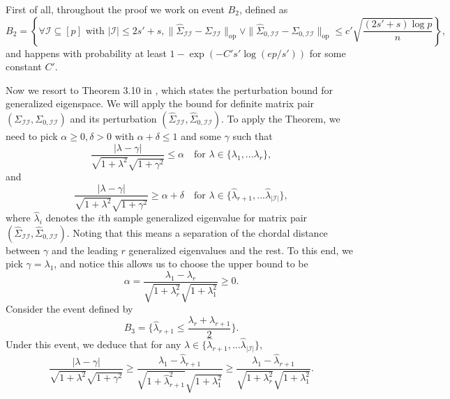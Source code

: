 \documentclass[11pt]{article}
\newcommand{\cI}{{\mathcal{I}}}
\newcommand{\0}{{\mathbf{0}}}
\begin{document}
\iffalse
First of all, throughout the proof we work on event $B_2$, defined as \begin{equation*}
B_2 = 
\left\{ \forall\text{$\cI\subseteq [p]$ with $|\cI|\leq 2s'+s,
\|\widehat{\Sigma}_{\cI\cI}-\Sigma_{\cI\cI}\|_{\mathrm{op}}\vee
\|\widehat{\Sigma}_{0,\cI\cI}-\Sigma_{0,\cI\cI}\|_{\mathrm{op}}
\leq c'\sqrt{\frac{(2s'+s)\log p}{n}}$}
\right \},
\end{equation*}
and happens with probability at least $1-\exp(-C's'\log(ep/s'))$ for some constant $C'$. 
\par Now we resort to Theorem 3.10 in \cite{stsu90}, which states the perturbation bound for generalized eigenspace. 
We will apply the bound for definite matrix pair $(\Sigma_{\cI\cI},\Sigma_{0,\cI\cI})$ and its perturbation $(\widehat{\Sigma}_{\cI\cI},\widehat{\Sigma}_{0,\cI\cI})$. To apply the Theorem, we need to pick $\alpha\geq 0, \delta>0$ with $\alpha+\delta\leq 1$ and some $\gamma$ such that \begin{equation*}
\frac{|\lambda-\gamma|}{\sqrt{1+\lambda^2}\sqrt{1+\gamma^2}}\leq \alpha\quad \text{for $\lambda\in\{\lambda_1,...\lambda_r\}$},
\end{equation*}
and \begin{equation*}
\frac{|\lambda-\gamma|}{\sqrt{1+\lambda^2}\sqrt{1+\gamma^2}}\geq \alpha+\delta\quad \text{for $\lambda\in\{\widehat{\lambda}_{r+1},...\widehat{\lambda}_{|\cI|}\}$},
\end{equation*}
where $\widehat{\lambda}_i$ denotes the $i$th sample generalized eigenvalue for matrix pair $(\widehat{\Sigma}_{\cI\cI},\widehat{\Sigma}_{0,\cI\cI})$. 
Noting that this means a separation of the chordal distance between $\gamma$ and the leading $r$ generalized eigenvalues and the rest. To this end, we pick $\gamma=\lambda_1$, and notice this allows us to choose the upper bound to be \begin{equation*}
\alpha=\frac{\lambda_1-\lambda_r}{\sqrt{1+\lambda_r^2}\sqrt{1+\lambda_1^2}}\geq 0.
\end{equation*}
Consider the event defined by \begin{equation*}
B_3=\{\widehat{\lambda}_{r+1}\leq \frac{\lambda_r+\lambda_{r+1}}{2}\}.
\end{equation*}Under this event, we deduce that for any $\lambda\in\{\widehat{\lambda}_{r+1},...\widehat{\lambda}_{|\cI|}\}$,\begin{equation*}
\frac{|\lambda-\gamma|}{\sqrt{1+\lambda^2}\sqrt{1+\gamma^2}}\ge \frac{\lambda_1-\widehat{\lambda}_{r+1}}{\sqrt{1+\widehat{\lambda}_{r+1}^2}\sqrt{1+\lambda_1^2}}\ge\frac{\lambda_1-\widehat{\lambda}_{r+1}}{\sqrt{1+\lambda_{r}^2}\sqrt{1+\lambda_1^2}}.
\end{equation*}
\end{document}
